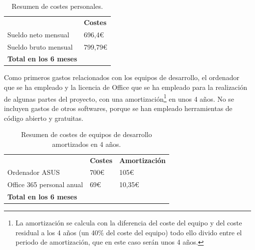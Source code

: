 \begin{table}[h!]
\centering
\begin{tabular}{ |m{5cm} m{3cm}|  } 
\hline
\cellcolor[HTML]{EFEFEF}\textbf{} & \cellcolor[HTML]{EFEFEF}\textbf{Costes}\\

Sueldo neto mensual           & {696,4€} \\

Sueldo bruto mensual                & {799,79€}\\
\hline
\cellcolor[HTML]{EFEFEF}\textbf{Total en los 6 meses}                & \cellcolor[HTML]{EFEFEF}{4798,74€} \\
\hline
\end{tabular}
\caption{Resumen de costes personales.}
\end{table}

Como primeros gastos relacionados con los equipos de desarrollo, el ordenador que se ha empleado y la licencia de Office que se ha empleado para la realización de algunas partes del proyecto, con una amortización\footnote{La amortización se calcula con la diferencia del coste del equipo y del coste residual a los 4 años (un 40\% del coste del equipo) todo ello divido entre el periodo de amortización, que en este caso serán unos 4 años.} \cite{amortizacion} en unos 4 años. No se incluyen gastos de otros softwares, porque se han empleado herramientas de código abierto y gratuitas.

\begin{table}[h!]
\centering
\begin{tabular}{ |m{5cm} m{3cm} m{3cm}|  } 
\hline
\cellcolor[HTML]{EFEFEF}\textbf{} & \cellcolor[HTML]{EFEFEF}\textbf{Costes}& \cellcolor[HTML]{EFEFEF}\textbf{Amortización}\\

Ordenador ASUS           & {700€} & {105€}\\

Office 365 personal anual              & {69€} & {10,35€}\\
\hline
\cellcolor[HTML]{EFEFEF}\textbf{Total en los 6 meses}                & \cellcolor[HTML]{EFEFEF}{769€} & \cellcolor[HTML]{EFEFEF}{115,35€} \\
\hline
\end{tabular}
\caption{Resumen de costes de equipos de desarrollo amortizados en 4 años.}
\end{table}


